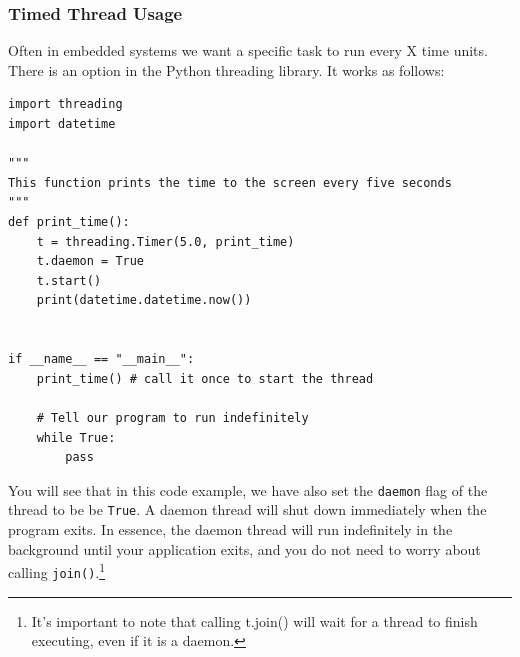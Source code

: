 \subsubsection{Timed Thread Usage}
Often in embedded systems we want a specific task to run every X time units. There is an option in the Python threading library. It works as follows:

\begin{lstlisting}
import threading
import datetime

"""
This function prints the time to the screen every five seconds
"""
def print_time():
    t = threading.Timer(5.0, print_time)
    t.daemon = True
    t.start()
    print(datetime.datetime.now())
	

if __name__ == "__main__":
    print_time() # call it once to start the thread
    
    # Tell our program to run indefinitely
    while True:
        pass
\end{lstlisting}

You will see that in this code example, we have also set the \verb|daemon| flag of the thread to be be \verb|True|. A daemon thread will shut down immediately when the program exits. In essence, the daemon thread will run indefinitely in the background until your application exits, and you do not need to worry about calling \verb|join()|.\footnote{It's important to note that calling t.join() will wait for a thread to finish executing, even if it is a daemon.}